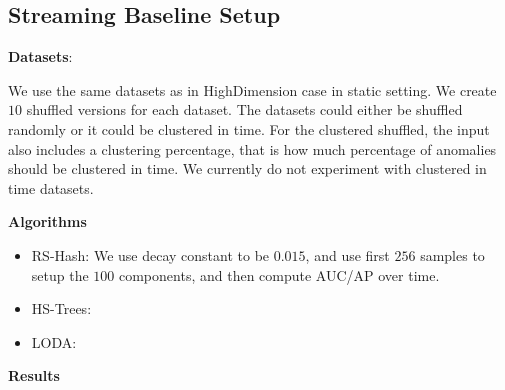 \subsection{Streaming Baseline Setup}

\textbf{Datasets}:

We use the same datasets as in HighDimension case in static setting. We create $10$ shuffled versions for each dataset. The datasets could either be shuffled randomly or it could be clustered in time. For the clustered shuffled, the input also includes a clustering percentage, that is how much percentage of anomalies should be clustered in time. We currently do not experiment with clustered in time datasets.

\textbf{Algorithms}
\begin{itemize}
\item{RS-Hash}: We use decay constant to be $0.015$, and use first $256$ samples to setup the $100$ components, and then compute AUC/AP over time.
\item{HS-Trees}:
\item{LODA}:
\end{itemize}

\textbf{Results}

